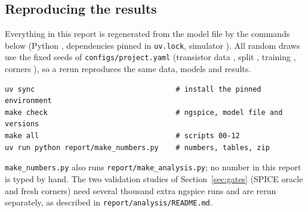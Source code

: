 \subsection{Reproducing the results}\label{sec:appreproduce}
Everything in this report is regenerated from the model file by the commands below (Python
\PythonVersion{}, dependencies pinned in \texttt{uv.lock}, simulator \SimVersion). All random draws
use the fixed seeds of \texttt{configs/project.yaml} (transistor data \SeedTransistorData, split
\SeedSplit, training \SeedTraining, corners \SeedCorners), so a rerun reproduces the same data,
models and results.
\begin{verbatim}
uv sync                                 # install the pinned environment
make check                              # ngspice, model file and versions
make all                                # scripts 00-12
uv run python report/make_numbers.py    # numbers, tables, zip
\end{verbatim}
\texttt{make\_numbers.py} also runs \texttt{report/make\_analysis.py}; no number in this report is
typed by hand. The two validation studies of Section~\ref{sec:gates} (SPICE oracle and fresh
corners) need several thousand extra ngspice runs and are rerun separately, as described in
\texttt{report/analysis/README.md}.

